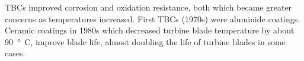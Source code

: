 TBCs improved corrosion and oxidation resistance, both which became greater concerns as temperatures increased. First TBCs (1970s) were aluminide coatings. Ceramic coatings in 1980s which decreased turbine blade temperature by about \SI{90}{\degree C}, improve blade life, almost doubling the life of turbine blades in some cases.
